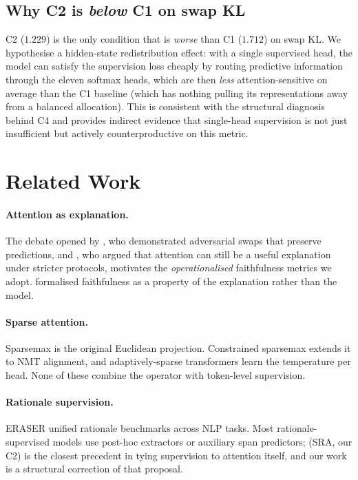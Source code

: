\documentclass{article}
\begin{document}
\subsection{Why C2 is \emph{below} C1 on swap KL}
C2 ($1.229$) is the only condition that is \emph{worse} than C1 ($1.712$) on swap KL. We
hypothesise a hidden-state redistribution effect: with a single supervised head, the
model can satisfy the supervision loss cheaply by routing predictive information through
the eleven softmax heads, which are then \emph{less} attention-sensitive on average than
the C1 baseline (which has nothing pulling its representations away from a balanced
allocation). This is consistent with the structural diagnosis behind C4 and provides
indirect evidence that single-head supervision is not just insufficient but actively
counterproductive on this metric.

\section{Related Work}
\label{sec:related}

\paragraph{Attention as explanation.}
The debate opened by \citet{jain2019attention}, who demonstrated adversarial swaps that
preserve predictions, and \citet{wiegreffe2019attention}, who argued that attention can
still be a useful explanation under stricter protocols, motivates the
\emph{operationalised} faithfulness metrics we adopt. \citet{jacovi2020faithful}
formalised faithfulness as a property of the explanation rather than the model.

\paragraph{Sparse attention.}
Sparsemax \citep{martins2016sparsemax} is the original Euclidean projection. Constrained
sparsemax \citep{malaviya2018sparse} extends it to NMT alignment, and adaptively-sparse
transformers \citep{correia2019adaptively} learn the temperature per head. None of these
combine the operator with token-level supervision.

\paragraph{Rationale supervision.}
ERASER \citep{deyoung2020eraser} unified rationale benchmarks across NLP tasks. Most
rationale-supervised models use post-hoc extractors or auxiliary span predictors;
\citet{eilertsen2025aligning} (SRA, our C2) is the closest precedent in tying supervision
to attention itself, and our work is a structural correction of that proposal.
\end{document}
